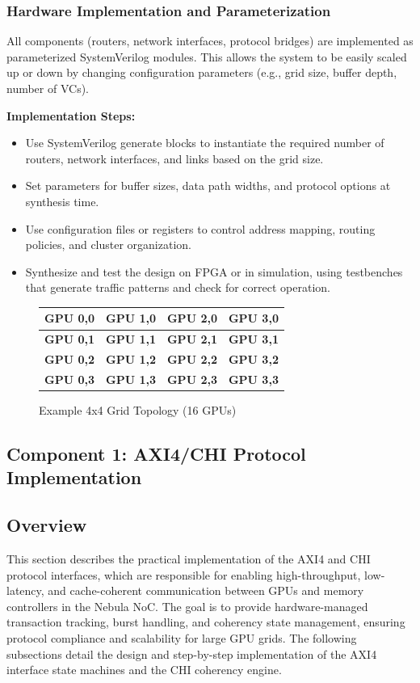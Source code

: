 \documentclass[11pt,a4paper]{article}
\begin{document}
\subsubsection{Hardware Implementation and Parameterization}
All components (routers, network interfaces, protocol bridges) are implemented as parameterized SystemVerilog modules. This allows the system to be easily scaled up or down by changing configuration parameters (e.g., grid size, buffer depth, number of VCs).

\textbf{Implementation Steps:}
\begin{itemize}
    \item Use SystemVerilog generate blocks to instantiate the required number of routers, network interfaces, and links based on the grid size.
    \item Set parameters for buffer sizes, data path widths, and protocol options at synthesis time.
    \item Use configuration files or registers to control address mapping, routing policies, and cluster organization.
    \item Synthesize and test the design on FPGA or in simulation, using testbenches that generate traffic patterns and check for correct operation.
\end{itemize}

\begin{figure}[H]
    \centering
    \begin{tabular}{|c|c|c|c|}
        \hline
        \textbf{GPU 0,0} & \textbf{GPU 1,0} & \textbf{GPU 2,0} & \textbf{GPU 3,0} \\
        \hline
        \textbf{GPU 0,1} & \textbf{GPU 1,1} & \textbf{GPU 2,1} & \textbf{GPU 3,1} \\
        \hline
        \textbf{GPU 0,2} & \textbf{GPU 1,2} & \textbf{GPU 2,2} & \textbf{GPU 3,2} \\
        \hline
        \textbf{GPU 0,3} & \textbf{GPU 1,3} & \textbf{GPU 2,3} & \textbf{GPU 3,3} \\
        \hline
    \end{tabular}
    \caption{Example 4x4 Grid Topology (16 GPUs)}
\end{figure}

\subsection{Component 1: AXI4/CHI Protocol Implementation}

\subsection*{Overview}
This section describes the practical implementation of the AXI4 and CHI protocol interfaces, which are responsible for enabling high-throughput, low-latency, and cache-coherent communication between GPUs and memory controllers in the Nebula NoC. The goal is to provide hardware-managed transaction tracking, burst handling, and coherency state management, ensuring protocol compliance and scalability for large GPU grids. The following subsections detail the design and step-by-step implementation of the AXI4 interface state machines and the CHI coherency engine.
\end{document}
